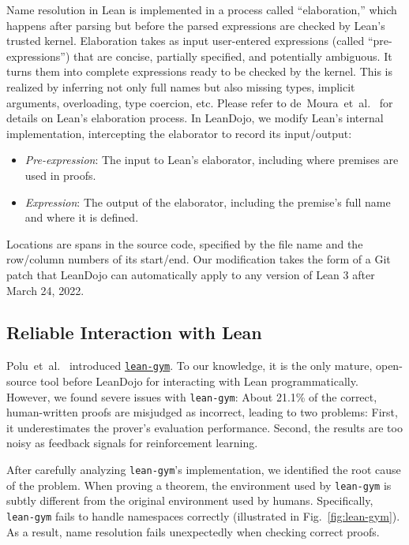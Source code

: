 \documentclass{article}
\begin{document}
Name resolution in Lean is implemented in a process called ``elaboration,'' which happens after parsing but before the parsed expressions are checked by Lean's trusted kernel. Elaboration takes as input user-entered expressions (called ``pre-expressions'') that are concise, partially specified, and potentially ambiguous. It turns them into complete expressions ready to be checked by the kernel. This is realized by inferring not only full names but also missing types, implicit arguments, overloading, type coercion, etc. Please refer to de~Moura~et~al.~\cite{de2015elaboration} for details on Lean's elaboration process. In LeanDojo, we modify Lean's internal implementation, intercepting the elaborator to record its input/output:
\begin{itemize}[leftmargin=*]
\item \emph{Pre-expression}: The input to Lean's elaborator, including where premises are used in proofs.
\item \emph{Expression}: The output of the elaborator, including the premise's full name and where it is defined.
\end{itemize}
Locations are spans in the source code, specified by the file name and the row/column numbers of its start/end. Our modification takes the form of a Git patch that LeanDojo can automatically apply to any version of Lean 3 after March 24, 2022.


\subsection{Reliable Interaction with Lean}
\label{appendix:leandojo:interaction}

Polu~et~al.~\cite{polu2023formal} introduced 
\href{https://github.com/openai/lean-gym}{\texttt{lean-gym}}. To our knowledge, it is the only mature, open-source tool before LeanDojo for interacting with Lean programmatically. However, we found severe issues with \texttt{lean-gym}: About 21.1\% of the correct, human-written proofs are misjudged as incorrect, leading to two problems: First, it underestimates the prover's evaluation performance. Second, the results are too noisy as feedback signals for reinforcement learning.

After carefully analyzing \texttt{lean-gym}'s implementation, we identified the root cause of the problem. When proving a theorem, the environment used by \texttt{lean-gym} is subtly different from the original environment used by humans. Specifically, \texttt{lean-gym} fails to handle namespaces correctly (illustrated in Fig.~\ref{fig:lean-gym}). As a result, name resolution fails unexpectedly when checking correct proofs.
\end{document}

